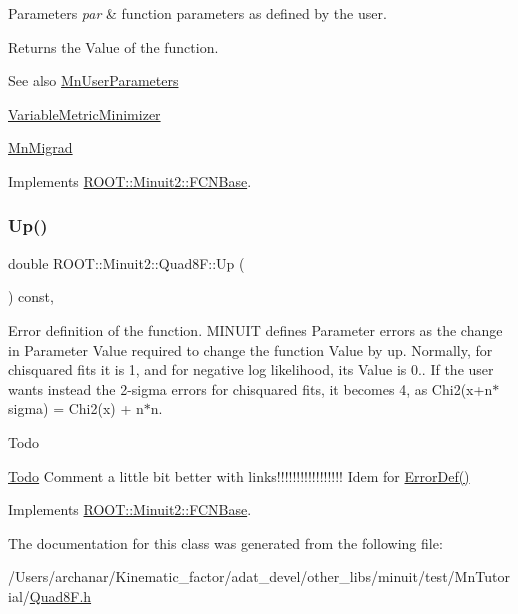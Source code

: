\begin{DoxyParams}{Parameters}
{\em par} & function parameters as defined by the user.\\
\hline
\end{DoxyParams}
\begin{DoxyReturn}{Returns}
the Value of the function.
\end{DoxyReturn}
\begin{DoxySeeAlso}{See also}
\mbox{\hyperlink{classROOT_1_1Minuit2_1_1MnUserParameters}{Mn\+User\+Parameters}} 

\mbox{\hyperlink{classROOT_1_1Minuit2_1_1VariableMetricMinimizer}{Variable\+Metric\+Minimizer}} 

\mbox{\hyperlink{classROOT_1_1Minuit2_1_1MnMigrad}{Mn\+Migrad}} 
\end{DoxySeeAlso}


Implements \mbox{\hyperlink{classROOT_1_1Minuit2_1_1FCNBase_ae4a86bd94d0d0f5ca6fc8f8ab2bb43cd}{R\+O\+O\+T\+::\+Minuit2\+::\+F\+C\+N\+Base}}.

\mbox{\label{classROOT_1_1Minuit2_1_1Quad8F_a8f241ff1340ea2184c7ee9247b8b200a}} 
\subsubsection{\texorpdfstring{Up()}{Up()}}
{\footnotesize\ttfamily double R\+O\+O\+T\+::\+Minuit2\+::\+Quad8\+F\+::\+Up (\begin{DoxyParamCaption}{ }\end{DoxyParamCaption}) const\hspace{0.3cm}{\ttfamily [inline]}, {\ttfamily [virtual]}}

Error definition of the function. M\+I\+N\+U\+IT defines Parameter errors as the change in Parameter Value required to change the function Value by up. Normally, for chisquared fits it is 1, and for negative log likelihood, its Value is 0.. If the user wants instead the 2-\/sigma errors for chisquared fits, it becomes 4, as Chi2(x+n$\ast$sigma) = Chi2(x) + n$\ast$n.

\begin{DoxyRefDesc}{Todo}
\item[\mbox{\hyperlink{todo__todo000001}{Todo}}]Comment a little bit better with links!!!!!!!!!!!!!!!!! Idem for \mbox{\hyperlink{classROOT_1_1Minuit2_1_1FCNBase_ac4592475c58a65b037ba97ab5f3cba10}{Error\+Def()}}\end{DoxyRefDesc}


Implements \mbox{\hyperlink{classROOT_1_1Minuit2_1_1FCNBase_a04ef08ddad92ce8d89d498efbe021c39}{R\+O\+O\+T\+::\+Minuit2\+::\+F\+C\+N\+Base}}.



The documentation for this class was generated from the following file\+:\begin{DoxyCompactItemize}
\item 
/\+Users/archanar/\+Kinematic\+\_\+factor/adat\+\_\+devel/other\+\_\+libs/minuit/test/\+Mn\+Tutorial/\mbox{\hyperlink{Quad8F_8h}{Quad8\+F.\+h}}\end{DoxyCompactItemize}
